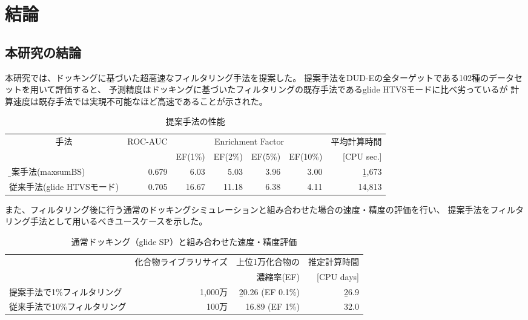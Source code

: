 \chapter{結論}
\section{本研究の結論}\label{sec:conclusion}
本研究では、ドッキングに基づいた超高速なフィルタリング手法を提案した。
提案手法をDUD-Eの全ターゲットである102種のデータセットを用いて評価すると、
予測精度はドッキングに基づいたフィルタリングの既存手法であるglide HTVSモードに比べ劣っているが
計算速度は既存手法では実現不可能なほど高速であることが示された。
\begin{table}[h] \centering
	\caption{提案手法の性能}
	\label{table:conclusion_1}
	\begin{tabular}{l|rrrrrr}
	\hline
	\multicolumn{1}{c|}{\multirow{2}{*}{手法}}	&\multirow{2}{*}{ROC-AUC}	&\multicolumn{4}{c}{Enrichment Factor}	&平均計算時間	\\
										&						&EF(1\%)	&EF(2\%)	&EF(5\%)	&EF(10\%)	&[CPU sec.]		\\ \hline
	\b{提案手法(maxsumBS)}				&0.679					&6.03	&5.03	&3.96	&3.00		&\b{1,673}		\\
	従来手法(glide HTVSモード)				&0.705				&16.67	&11.18	&6.38	&4.11		&14,813			\\ \hline
	\end{tabular}
\end{table}



また、フィルタリング後に行う通常のドッキングシミュレーションと組み合わせた場合の速度・精度の評価を行い、
提案手法をフィルタリング手法として用いるべきユースケースを示した。
\begin{table}[htbp] \centering
	\caption{通常ドッキング（glide SP）と組み合わせた速度・精度評価}
	\label{table:conclusion_2}
	\begin{tabular}{l|rrr}
	\hline
												&\multirow{2}{*}{化合物ライブラリサイズ}	&上位1万化合物の		&推定計算時間	\\
												&														&濃縮率(EF)				&[CPU days]		\\ \hline
	提案手法で1\%フィルタリング		&1,000万											&\b{20.26 (EF 0.1\%)}		&\b{26.9}				\\
	従来手法で10\%フィルタリング	&100万												&16.89 (EF 1\%)			&32.0				\\ \hline
	\end{tabular}
\end{table}


